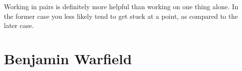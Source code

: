 Working in pairs is definitely more helpful than working on one thing alone. In the former
case you less likely tend to get stuck at a point, as compared to the later case. 


\section{Benjamin Warfield}


